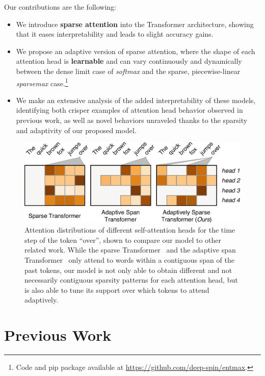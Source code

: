 Our contributions are the following:

\begin{itemize}
    \item We introduce \textbf{sparse attention} into the
          Transformer architecture, showing that it eases
          interpretability and leads to slight accuracy gains.
    \item We propose an adaptive version of sparse attention,
          where the shape of each attention head is {\bf learnable} and can vary continuously and
          dynamically between the dense limit case of \emph{softmax} and the sparse,
          piecewise-linear \emph{sparsemax} case.\footnote{
              Code and pip package available at \url{https://github.com/deep-spin/entmax}.}
    \item We make an extensive analysis of the added interpretability of these
          models, identifying both crisper examples of attention head behavior observed in
          previous work, as well as novel behaviors unraveled thanks to the sparsity
          and adaptivity of our proposed model.
\end{itemize}

\begin{figure}[htbp]
    \centering
    \includegraphics[width=0.95\columnwidth]{Figures/comparison.pdf}
    \caption{Attention distributions of different self-attention heads for the
        time step of the token ``over'', shown to compare our model to other
        related work. While the sparse
        Transformer~\citep{openai_sparse_transf} and the adaptive span
        Transformer~\citep{Sukhbaatar2019} only attend to words within a
        contiguous span of the past tokens, our model is not only able to
        obtain different and not necessarily contiguous sparsity patterns for
        each attention head, but is also able to tune its support over which
        tokens to attend adaptively.}
    \label{fig:comparison}
\end{figure}

\section{Previous Work}

